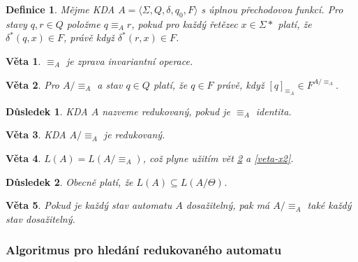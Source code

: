 \documentclass[10pt,a4paper]{article}
\theoremstyle{note}
\newtheorem{veta}{Věta}
\newtheorem{definice}{Definice}
\newtheorem{dusledek}{Důsledek}
\begin{document}
\begin{definice}
Mějme KDA $A = \langle \Sigma, Q, \delta, q_{0}, F \rangle$ s úplnou přechodovou funkcí.
Pro stavy $q, r \in Q$ položme $q \equiv_{A} r$, pokud pro každ\'y řetězec $x \in \Sigma{*}$ plat\'i, že $\delta^{*}(q,x) \in F$,
právě když $\delta^{*}(r,x) \in F$.
\end{definice}

\begin{veta}\label{veta-zprava}
$\equiv_{A}$ je zprava invariantní operace.
\end{veta}

\begin{veta}\label{veta-4}
Pro $A/ \equiv_{A}$ a stav $q \in Q$ plat\'i, že $q \in F$ pr\'avě, když $[q]_{\equiv_{A}} \in F^{A/ \equiv_{A}}$.
\end{veta}

\begin{dusledek}
KDA $A$ nazveme redukovan\'y, pokud je $\equiv_{A}$ identita.
\end{dusledek}

\begin{veta}
KDA $A/ \equiv_{A}$ je redukovaný.
\end{veta}

\begin{veta}
$L(A) = L(A/ \equiv_{A})$, což plyne užit\'im vět \ref{veta-4} a \ref{veta-x2}.
\end{veta}

\begin{dusledek}
Obecně plat\'i, že $L(A) \subseteq L(A/ \Theta)$.
\end{dusledek}

\begin{veta}
Pokud je každ\'y stav automatu $A$ dosažiteln\'y, pak m\'a $A/ \equiv_{A}$ tak\'e každ\'y stav dosažiteln\'y.
\end{veta}

\subsubsection{Algoritmus pro hled\'an\'i redukovan\'eho automatu}
\end{document}
